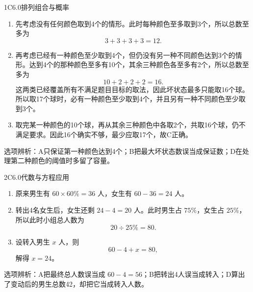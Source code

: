 
\begin{solution}{1}{C}{6.0}{排列组合与概率}
\begin{enumerate}[label=\textbf{Step \arabic*:},leftmargin=*]
\item 先考虑没有任何颜色取到4个的情形。此时每种颜色至多取到3个，所以总数至多为
\[
  3+3+3+3=12.
\]
\item 再考虑已经有一种颜色至少取到4个，但仍没有另一种不同颜色达到3个的情形。达到4个的那种颜色至多有10个，其余三种颜色各至多有2个，所以总数至多为
\[
  10+2+2+2=16.
\]
这两类已经覆盖所有不满足题目目标的取法，因此坏状态最多只能取16个球。所以取17个球时，必有一种颜色至少取到4个，并且另有一种不同颜色至少取到3个。
\item 取完某一种颜色的10个球，再从其余三种颜色中各取2个，共取16个球，仍不满足要求。因此16个确实不够，最少应取17个，故C正确。
\end{enumerate}
选项辨析：A只保证第一种颜色达到4个；B把最大坏状态数误当成保证数；D在处理第二种颜色的阈值时多留了容量。
\end{solution}

\begin{solution}{2}{C}{6.0}{代数与方程应用}
\begin{enumerate}[label=\textbf{Step \arabic*:},leftmargin=*]
\item 原来男生有 \(60\times60\%=36\) 人，女生有 \(60-36=24\) 人。
\item 转出4名女生后，女生还剩 \(24-4=20\) 人。此时男生占 \(75\%\)，女生占 \(25\%\)，所以此时小组总人数为
\[
  20\div25\%=80.
\]
\item 设转入男生 \(x\) 人，则
\[
  60-4+x=80,
\]
解得 \(x=24\)。
\end{enumerate}
选项辨析：A把最终总人数误当成 \(60-4=56\)；B把转出4人误当成转入；D算出了变动后的男生总数42，却把它当成转入人数。
\end{solution}

